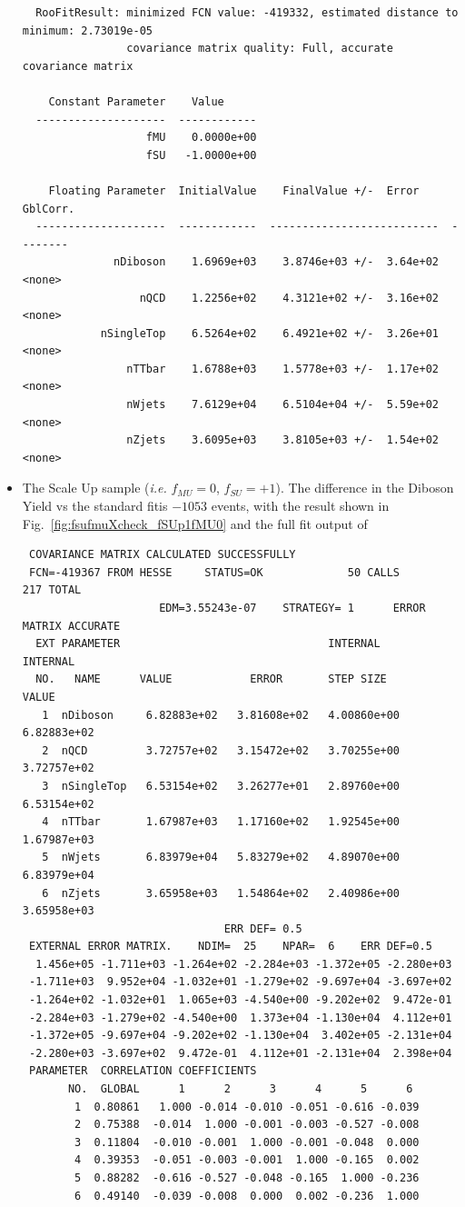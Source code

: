 \begin{itemize}
{\begin{verbatim}
  RooFitResult: minimized FCN value: -419332, estimated distance to minimum: 2.73019e-05
                covariance matrix quality: Full, accurate covariance matrix

    Constant Parameter    Value     
  --------------------  ------------
                   fMU    0.0000e+00
                   fSU   -1.0000e+00

    Floating Parameter  InitialValue    FinalValue +/-  Error     GblCorr.
  --------------------  ------------  --------------------------  --------
              nDiboson    1.6969e+03    3.8746e+03 +/-  3.64e+02  <none>
                  nQCD    1.2256e+02    4.3121e+02 +/-  3.16e+02  <none>
            nSingleTop    6.5264e+02    6.4921e+02 +/-  3.26e+01  <none>
                nTTbar    1.6788e+03    1.5778e+03 +/-  1.17e+02  <none>
                nWjets    7.6129e+04    6.5104e+04 +/-  5.59e+02  <none>
                nZjets    3.6095e+03    3.8105e+03 +/-  1.54e+02  <none>

\end{verbatim}
}

\item The Scale Up sample (\textit{i.e.} $f_{MU}=0$, $f_{SU}=+1$). The difference in the Diboson Yield vs the standard fitis $-1053$ events, with the result shown in Fig.~\ref{fig:fsufmuXcheck_fSUp1fMU0} and the full fit output of
{\tiny
\begin{verbatim}
 COVARIANCE MATRIX CALCULATED SUCCESSFULLY
 FCN=-419367 FROM HESSE     STATUS=OK             50 CALLS         217 TOTAL
                     EDM=3.55243e-07    STRATEGY= 1      ERROR MATRIX ACCURATE 
  EXT PARAMETER                                INTERNAL      INTERNAL  
  NO.   NAME      VALUE            ERROR       STEP SIZE       VALUE   
   1  nDiboson     6.82883e+02   3.81608e+02   4.00860e+00   6.82883e+02
   2  nQCD         3.72757e+02   3.15472e+02   3.70255e+00   3.72757e+02
   3  nSingleTop   6.53154e+02   3.26277e+01   2.89760e+00   6.53154e+02
   4  nTTbar       1.67987e+03   1.17160e+02   1.92545e+00   1.67987e+03
   5  nWjets       6.83979e+04   5.83279e+02   4.89070e+00   6.83979e+04
   6  nZjets       3.65958e+03   1.54864e+02   2.40986e+00   3.65958e+03
                               ERR DEF= 0.5
 EXTERNAL ERROR MATRIX.    NDIM=  25    NPAR=  6    ERR DEF=0.5
  1.456e+05 -1.711e+03 -1.264e+02 -2.284e+03 -1.372e+05 -2.280e+03 
 -1.711e+03  9.952e+04 -1.032e+01 -1.279e+02 -9.697e+04 -3.697e+02 
 -1.264e+02 -1.032e+01  1.065e+03 -4.540e+00 -9.202e+02  9.472e-01 
 -2.284e+03 -1.279e+02 -4.540e+00  1.373e+04 -1.130e+04  4.112e+01 
 -1.372e+05 -9.697e+04 -9.202e+02 -1.130e+04  3.402e+05 -2.131e+04 
 -2.280e+03 -3.697e+02  9.472e-01  4.112e+01 -2.131e+04  2.398e+04 
 PARAMETER  CORRELATION COEFFICIENTS  
       NO.  GLOBAL      1      2      3      4      5      6
        1  0.80861   1.000 -0.014 -0.010 -0.051 -0.616 -0.039
        2  0.75388  -0.014  1.000 -0.001 -0.003 -0.527 -0.008
        3  0.11804  -0.010 -0.001  1.000 -0.001 -0.048  0.000
        4  0.39353  -0.051 -0.003 -0.001  1.000 -0.165  0.002
        5  0.88282  -0.616 -0.527 -0.048 -0.165  1.000 -0.236
        6  0.49140  -0.039 -0.008  0.000  0.002 -0.236  1.000


\end{verbatim}}
\end{itemize}
